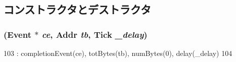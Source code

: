 \subsection{コンストラクタとデストラクタ}
\hypertarget{structDmaPort_1_1DmaReqState_a78244c7f4503a134344a6d078ab5a441}{
\subsubsection[{DmaReqState}]{ ({\bf Event} $\ast$ {\em ce}, \/  {\bf Addr} {\em tb}, \/  {\bf Tick} {\em \_\-delay})}}
\label{structDmaPort_1_1DmaReqState_a78244c7f4503a134344a6d078ab5a441}



\begin{DoxyCode}
103             : completionEvent(ce), totBytes(tb), numBytes(0), delay(_delay)
104         {}
\end{DoxyCode}


